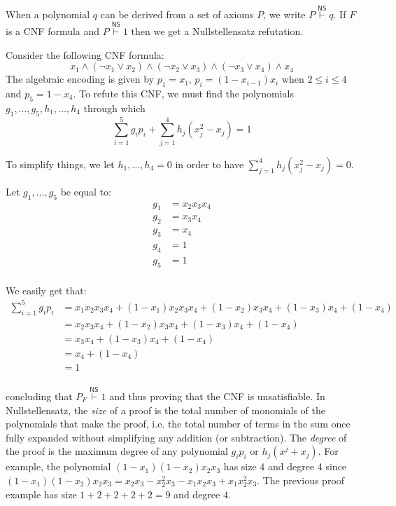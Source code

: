 When a polynomial $q$ can be derived from a set of axioms $P$, we write $P \stackrel{\mathsf{NS}}{\vdash} q$. If $F$ is a CNF formula and $P \stackrel{\mathsf{NS}}{\vdash} 1$ then we get a Nullstellensatz refutation.

Consider the following CNF formula:
\[x_1 \land (\lnot x_1 \lor x_2) \land (\lnot x_2 \lor x_3) \land (\lnot x_3 \lor x_4)\land x_4\]
The algebraic encoding is given by $p_1 = x_1$, $p_i = (1-x_{i-1})x_i$ when $2 \leq i \leq 4$ and $p_5 = 1-x_4$. To refute this CNF, we must find the polynomials $g_1, \ldots, g_5, h_1, \ldots, h_4$ through which
\[\sum_{i = 1}^5 g_ip_{i} + \sum_{j = 1}^4 h_j(x_j^2-x_j) = 1\]

To simplify things, we let $h_1, \ldots, h_4 = 0$ in order to have $\sum_{j = 1}^4 h_j(x_j^2-x_j) = 0$.

Let $g_1, \ldots, g_5$ be equal to:
\[\begin{split}
 g_1 &= x_2x_3x_4 \\
 g_2 &= x_3x_4 \\
 g_3 &= x_4 \\
 g_4 &= 1 \\
 g_5 &= 1 \\
\end{split}\]

We easily get that:
\[\begin{split}
    \sum_{i = 1}^5 g_ip_{i}&= x_1x_2x_3x_4 + (1-x_1)x_2x_3x_4 + (1-x_2)x_3x_4 + (1-x_3)x_4 + (1-x_4)\\
    &= x_2x_3x_4 + (1-x_2)x_3x_4 + (1-x_3)x_4 + (1-x_4)\\
    &= x_3x_4 + (1-x_3)x_4 + (1-x_4)\\
    &= x_4 + (1-x_4)\\
    &= 1\\
\end{split}\]

concluding that $P_F \stackrel{\mathsf{NS}}{\vdash} 1$ and thus proving that the CNF is unsatisfiable. In Nullstellensatz, the \textit{size} of a proof is the total number of monomials of the polynomials that make the proof, i.e. the total number of terms in the sum once fully expanded without simplifying any addition (or subtraction). The \textit{degree} of the proof is the maximum degree of any polynomial $g_ip_i$ or $h_j(x^j+x_j)$. For example, the polynomial $(1-x_1)(1-x_2)x_2x_3$ has size 4 and degree 4 since $(1-x_1)(1-x_2)x_2x_3 = x_2x_3 - x_2^2x_3 - x_1x_2x_3 + x_1x_2^2x_3$. The previous proof example has size $1+2+2+2+2 = 9$ and degree $4$.

